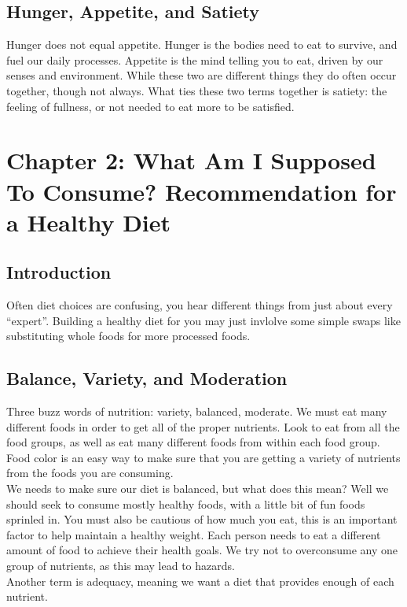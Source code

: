 \documentclass[letterpaper, 11pt]{article}
\begin{document}
\subsection{Hunger, Appetite, and Satiety}
\label{sec:org9c1e041}
Hunger does not equal appetite. Hunger is the bodies need to eat to survive, and fuel our daily processes. Appetite is the mind telling you to eat, driven by our senses and environment. While these two are different things they do often occur together, though not always. What ties these two terms together is satiety: the feeling of fullness, or not needed to eat more to be satisfied.\\
\section{Chapter 2: What Am I Supposed To Consume? Recommendation for a Healthy Diet}
\label{sec:org69f5412}
\subsection{Introduction}
\label{sec:org525cd1b}
Often diet choices are confusing, you hear different things from just about every ``expert''. Building a healthy diet for you may just invlolve some simple swaps like substituting whole foods for more processed foods.\\
\subsection{Balance, Variety, and Moderation}
\label{sec:org1b14ab8}
Three buzz words of nutrition: variety, balanced, moderate. We must eat many different foods in order to get all of the proper nutrients. Look to eat from all the food groups, as well as eat many different foods from within each food group. Food color is an easy way to make sure that you are getting a variety of nutrients from the foods you are consuming.\\
We needs to make sure our diet is balanced, but what does this mean? Well we should seek to consume mostly healthy foods, with a little bit of fun foods sprinled in. You must also be cautious of how much you eat, this is an important factor to help maintain a healthy weight. Each person needs to eat a different amount of food to achieve their health goals. We try not to overconsume any one group of nutrients, as this may lead to hazards.\\
Another term is adequacy, meaning we want a diet that provides enough of each nutrient.\\
\end{document}
